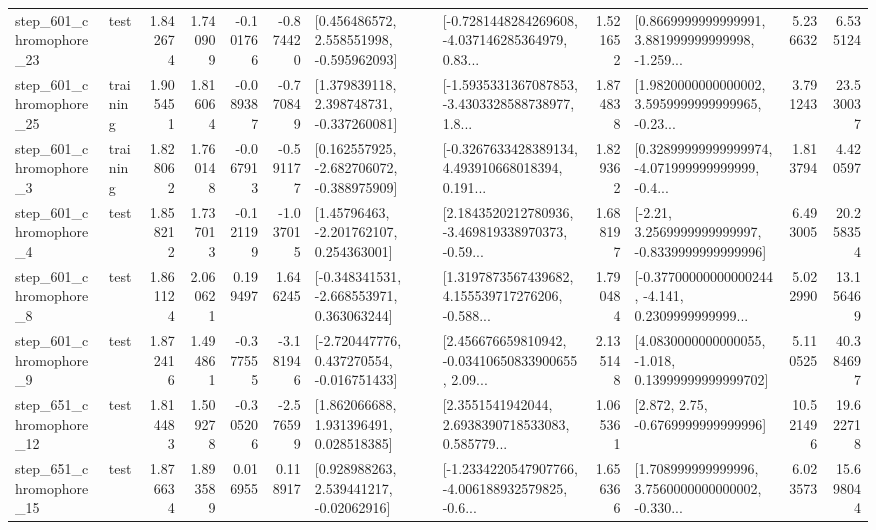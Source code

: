 \begin{tabular}{llrrrrllrlrr}
  step\_601\_chromophore\_23 &      test &      1.842674 &    1.740909 &     -0.101766 & -0.874420 &    [0.456486572, 2.558551998, -0.595962093] &  [-0.7281448284269608, -4.037146285364979, 0.83... &       1.521652 &  [0.8669999999999991, 3.881999999999998, -1.259... &            5.236632 &          6.535124 \\
  step\_601\_chromophore\_25 &  training &      1.905451 &    1.816064 &     -0.089387 & -0.770849 &    [1.379839118, 2.398748731, -0.337260081] &  [-1.5935331367087853, -3.4303328588738977, 1.8... &       1.874838 &  [1.9820000000000002, 3.5959999999999965, -0.23... &            3.791243 &         23.530037 \\
   step\_601\_chromophore\_3 &  training &      1.828062 &    1.760148 &     -0.067913 & -0.591177 &   [0.162557925, -2.682706072, -0.388975909] &  [-0.3267633428389134, 4.493910668018394, 0.191... &       1.829362 &  [0.32899999999999974, -4.071999999999999, -0.4... &            1.813794 &          4.420597 \\
   step\_601\_chromophore\_4 &      test &      1.858212 &    1.737013 &     -0.121199 & -1.037015 &     [1.45796463, -2.201762107, 0.254363001] &  [2.1843520212780936, -3.469819338970373, -0.59... &       1.688197 &   [-2.21, 3.2569999999999997, -0.8339999999999996] &            6.493005 &         20.258354 \\
   step\_601\_chromophore\_8 &      test &      1.861124 &    2.060621 &      0.199497 &  1.646245 &   [-0.348341531, -2.668553971, 0.363063244] &  [1.3197873567439682, 4.155539717276206, -0.588... &       1.790484 &  [-0.37700000000000244, -4.141, 0.2309999999999... &            5.022990 &         13.156469 \\
   step\_601\_chromophore\_9 &      test &      1.872416 &    1.494861 &     -0.377555 & -3.181946 &   [-2.720447776, 0.437270554, -0.016751433] &  [2.456676659810942, -0.03410650833900655, 2.09... &       2.135148 &  [4.0830000000000055, -1.018, 0.13999999999999702] &            5.110525 &         40.384697 \\
  step\_651\_chromophore\_12 &      test &      1.814483 &    1.509278 &     -0.305206 & -2.576599 &     [1.862066688, 1.931396491, 0.028518385] &  [2.3551541942044, 2.6938390718533083, 0.585779... &       1.065361 &                 [2.872, 2.75, -0.6769999999999996] &           10.521496 &         19.622718 \\
  step\_651\_chromophore\_15 &      test &      1.876634 &    1.893589 &      0.016955 &  0.118917 &     [0.928988263, 2.539441217, -0.02062916] &  [-1.2334220547907766, -4.006188932579825, -0.6... &       1.656366 &  [1.708999999999996, 3.7560000000000002, -0.330... &            6.023573 &         15.698044 \\

\end{tabular}
